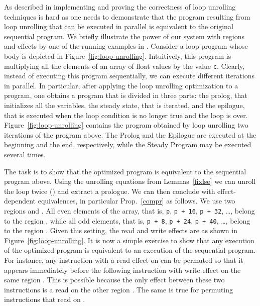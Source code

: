 \documentclass[orivec]{llncs}
\begin{document}
As described in \cite{tristan10popl} implementing and proving the
correctness of loop unrolling techniques is hard as
one needs to demonstrate that the program resulting from loop unrolling
that can be executed in parallel is equivalent to the original sequential
program. We briefly illustrate the power of our system with regions and
effects by one of the running examples in \cite{tristan10popl}. Consider
a loop program whose body is depicted in Figure~\ref{fig:loop-unrolling}.
Intuitively, this program is multiplying all the elements of an array of 
float values by the value \texttt{c}. Clearly, instead of executing this
program sequentially, we can execute different iterations in parallel. 
In particular, after applying the loop unrolling optimization to a program,
one obtains a program that is divided in three parts: the prolog, that
initializes all the variables, the steady state, that is iterated, and the
epilogue, that is executed when the loop condition is no longer true and
the loop is over. Figure~\ref{fig:loop-unrolling} contains the program
obtained by loop unrolling two iterations of the program above. The Prolog
and the Epilogue are executed at the beginning and the end, respectively,
while the Steady Program may be executed several times. 

The task is to show that the optimized program is equivalent to the
sequential program above. Using the unrolling equations from
Lemmas~\ref{fixlse} we can unroll the loop twice
() and extract a prologue. We can then conclude with
effect-dependent equivalences, in particular Prop.~\ref{compr} as
follows. We use two regions 
and . All even elements of the array, that is, \texttt{p},
\texttt{p + 16}, \texttt{p + 32}, \ldots, belong to the region ,
while all odd elements, that is, \texttt{p + 8},
\texttt{p + 24}, \texttt{p + 40}, \ldots, belong to the region .
Given this setting, the read and write effects are as shown in
Figure~\ref{fig:loop-unrolling}. It is now a simple exercise to show that
any execution of the optimized program is equivalent to an execution of
the sequential program. For instance, any instruction with a read effect 
on  can be permuted so that it appears immediately before the
following instruction with write effect  on the same region
. This is possible because the only effect between these two
instructions is a read on the other region . The same is true
for permuting instructions that read on . 
\fi
\end{document}
